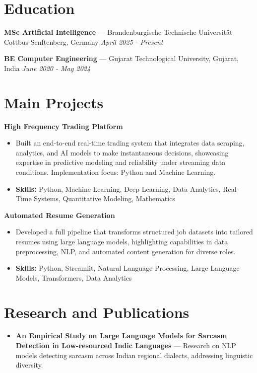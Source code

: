 \documentclass[a4paper,10pt]{article}
\begin{document}
\section*{Education}
\textbf{MSc Artificial Intelligence} — Brandenburgische Technische Universität Cottbus-Senftenberg, Germany \hfill \textit{April 2025 - Present}\par
\vspace{1.5pt}
\textbf{BE Computer Engineering} — Gujarat Technological University, Gujarat, India \hfill \textit{June 2020 - May 2024}\par

\section*{Main Projects}
\textbf{High Frequency Trading Platform}\par
\vspace{1pt}
\begin{itemize}
  \item Built an end-to-end real-time trading system that integrates data scraping, analytics, and AI models to make instantaneous decisions, showcasing expertise in predictive modeling and reliability under streaming data conditions. Implementation focus: Python and Machine Learning.
  \item \textbf{Skills:} Python, Machine Learning, Deep Learning, Data Analytics, Real-Time Systems, Quantitative Modeling, Mathematics
\end{itemize}
\vspace{3pt}
\textbf{Automated Resume Generation}\par
\vspace{1pt}
\begin{itemize}
  \item Developed a full pipeline that transforms structured job datasets into tailored resumes using large language models, highlighting capabilities in data preprocessing, NLP, and automated content generation for diverse roles.
  \item \textbf{Skills:} Python, Streamlit, Natural Language Processing, Large Language Models, Transformers, Data Analytics
\end{itemize}

\section*{Research and Publications}
\begin{itemize}
\item \textbf{An Empirical Study on Large Language Models for Sarcasm Detection in Low-resourced Indic Languages} — Research on NLP models detecting sarcasm across Indian regional dialects, addressing linguistic diversity.
\end{itemize}
\end{document}
